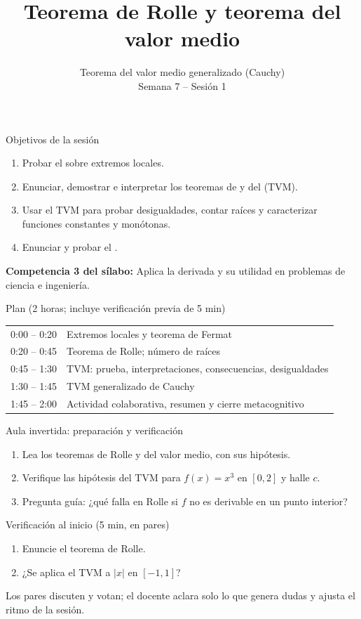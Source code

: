 \documentclass[10pt,aspectratio=169]{beamer}
\title[Rolle y valor medio]{Teorema de Rolle y teorema del valor medio}
\subtitle{Teorema del valor medio generalizado (Cauchy)\\[2pt]\small Semana 7 -- Sesión 1}
\begin{document}
\begin{frame}
  \titlepage
\end{frame}

\begin{frame}{Objetivos de la sesión}
  \begin{enumerate}
    \item Probar el  sobre extremos locales.
    \item Enunciar, demostrar e interpretar los teoremas de  y del  (TVM).
    \item Usar el TVM para probar desigualdades, contar raíces y caracterizar funciones constantes y monótonas.
    \item Enunciar y probar el .
  \end{enumerate}
  \vspace{1mm}
  {\small\textbf{Competencia 3 del sílabo:} Aplica la derivada y su utilidad en problemas de ciencia e ingeniería.}
  \begin{block}{Plan (2 horas; incluye verificación previa de 5 min)}
    \begin{tabular}{ll}
      0:00 -- 0:20 & Extremos locales y teorema de Fermat\\
      0:20 -- 0:45 & Teorema de Rolle; número de raíces\\
      0:45 -- 1:30 & TVM: prueba, interpretaciones, consecuencias, desigualdades\\
      1:30 -- 1:45 & TVM generalizado de Cauchy\\
      1:45 -- 2:00 & Actividad colaborativa, resumen y cierre metacognitivo
    \end{tabular}
  \end{block}
\end{frame}

\begin{frame}{Aula invertida: preparación y verificación}
  \small
  \begin{previa}
    \begin{enumerate}
      \item Lea los teoremas de Rolle y del valor medio, con sus hipótesis.
      \item Verifique las hipótesis del TVM para $f(x)=x^3$ en $[0,2]$ y halle $c$.
      \item Pregunta guía: ¿qué falla en Rolle si $f$ no es derivable en un punto interior?
    \end{enumerate}
  \end{previa}
  \begin{block}{Verificación al inicio (5 min, en pares)}
    \begin{enumerate}
      \item Enuncie el teorema de Rolle.
      \item ¿Se aplica el TVM a $|x|$ en $[-1,1]$?
    \end{enumerate}
    Los pares discuten y votan; el docente aclara solo lo que genera dudas y ajusta el ritmo de la sesión.
  \end{block}
\end{frame}
\end{document}

